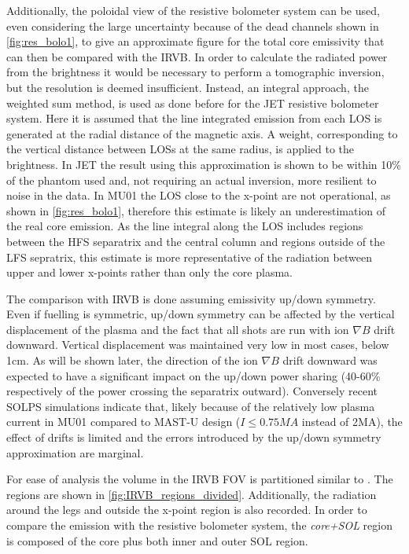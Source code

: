 Additionally, the poloidal view of the resistive bolometer system can be used, even considering the large uncertainty because of the dead channels shown in \autoref{fig:res_bolo1}, to give an approximate figure for the total core emissivity that can then be compared with the IRVB. In order to calculate the radiated power from the brightness it would be necessary to perform a tomographic inversion, but the resolution is deemed insufficient. Instead, an integral approach, the weighted sum method, is used as done before for the JET resistive bolometer system.\cite{Ingesson2000} Here it is assumed that the line integrated emission from each LOS is generated at the radial distance of the magnetic axis. A weight, corresponding to the vertical distance between LOSs at the same radius, is applied to the brightness. In JET the result using this approximation is shown to be within 10\% of the phantom used and, not requiring an actual inversion, more resilient to noise in the data. In MU01 the LOS close to the x-point are not operational, as shown in \autoref{fig:res_bolo1}, therefore this estimate is likely an underestimation of the real core emission. As the line integral along the LOS includes regions between the HFS separatrix and the central column and regions outside of the LFS sepratrix, this estimate is more representative of the radiation between upper and lower x-points rather than only the core plasma.

The comparison with IRVB is done assuming emissivity up/down symmetry. Even if fuelling is symmetric, up/down symmetry can be affected by the vertical displacement of the plasma and the fact that all shots are run with ion $\nabla B$ drift downward. Vertical displacement was maintained very low in most cases, below 1cm. As will be shown later, the direction of the ion $\nabla B$ drift downward was expected to have a significant impact on the up/down power sharing (40-60\% respectively of the power crossing the separatrix outward).\cite{Fevrier2021} Conversely recent SOLPS simulations indicate that, likely because of the relatively low plasma current in MU01 compared to MAST-U design ($I\leq 0.75MA$ instead of 2MA), the effect of drifts is limited and the errors introduced by the up/down symmetry approximation are marginal.

For ease of analysis the volume in the IRVB FOV is partitioned similar to \cite{Harrison2017}. The regions are shown in \autoref{fig:IRVB_regions_divided}. Additionally, the radiation around the legs and outside the x-point region is also recorded. In order to compare the emission with the resistive bolometer system, the \emph{core+SOL} region is composed of the core plus both inner and outer SOL region.

